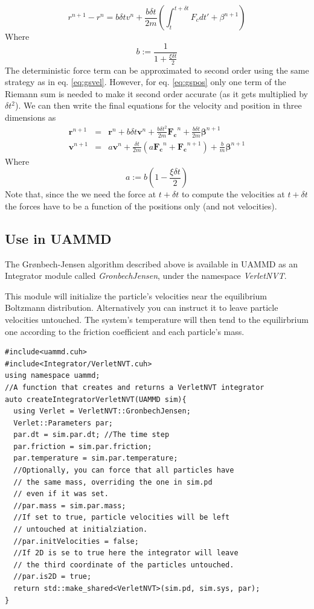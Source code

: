 \documentclass[ twoside,openright,titlepage,numbers=noenddot,%
headinclude,footinclude,cleardoublepage=empty,abstract=on,
BCOR=5mm,paper=a4,fontsize=11pt, dvipsnames
]{scrreprt}
\renewcommand{\vec}[1]{\bm{#1}}
\newcommand{\uammd}{\gls{UAMMD}\xspace}
\newcommand{\dt}{\delta t}
\begin{document}
\begin{equation}
  \label{eq:gspos}
  r^{n+1} - r^n =  b \dt v^n + \frac{b\dt}{2m}\left(\int_t^{t+\dt}F_cdt' + \beta^{n+1}\right)
\end{equation}
Where
\begin{equation}
b := \frac{1}{1+\frac{\xi\dt}{2}}
\end{equation}
The deterministic force term can be approximated to second order using the same strategy as in eq. \eqref{eq:gsvel}. However, for eq. \eqref{eq:gspos} only one term of the Riemann sum is needed to make it second order accurate (as it gets multiplied by $\dt^2$). We can then write the final equations for the velocity and position in three dimensions as
\begin{eqnarray}
  \label{eq:gsfinal}
  \vec{r}^{n+1}  &=&  \vec{r}^n + b \dt \vec{v}^n + \frac{b\dt^2}{2m}\vec{F_c}^n + \frac{b\dt}{2m}\vec{\beta}^{n+1}\\
  \vec{v}^{n+1} &=& a\vec{v}^n + \frac{\dt}{2m}\left(a\vec{F_c}^n + \vec{F_c} ^{n+1}\right) +  \frac{b}{m}\vec{\beta}^{n+1}
\end{eqnarray}
Where
\begin{equation}
  a:=b \left(1-\frac{\xi\dt}{2}\right)
\end{equation}
Note that, since the we need the force at $t+\dt$ to compute the velocities at $t+\dt$ the forces have to be a function of the positions only (and not velocities).

\subsection{Use in UAMMD}
The Grønbech-Jensen algorithm described above is available in \uammd as an Integrator module called \emph{GronbechJensen}, under the namespace \emph{VerletNVT}.

This module will initialize the particle's velocities near the equilibrium Boltzmann distribution.
Alternatively you can instruct it to leave particle velocities untouched. The system's temperature will then tend to the equilirbrium one according to the friction coefficient and each particle's mass.

\begin{verbatim}
#include<uammd.cuh>
#include<Integrator/VerletNVT.cuh>
using namespace uammd;
//A function that creates and returns a VerletNVT integrator
auto createIntegratorVerletNVT(UAMMD sim){
  using Verlet = VerletNVT::GronbechJensen;
  Verlet::Parameters par;
  par.dt = sim.par.dt; //The time step
  par.friction = sim.par.friction;
  par.temperature = sim.par.temperature; 
  //Optionally, you can force that all particles have
  // the same mass, overriding the one in sim.pd
  // even if it was set.
  //par.mass = sim.par.mass;
  //If set to true, particle velocities will be left
  // untouched at initialziation.
  //par.initVelocities = false;
  //If 2D is se to true here the integrator will leave
  // the third coordinate of the particles untouched.
  //par.is2D = true;
  return std::make_shared<VerletNVT>(sim.pd, sim.sys, par);
}
\end{verbatim}
\end{document}
